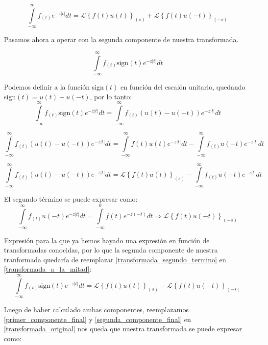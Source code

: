 \documentclass[12pt]{article}
\begin{document}
\begin{equation}
\int\limits_{-\infty}^{\infty} f_{(t)} e^{-z |t|}dt= \mathcal{L}\left\{f(t)u(t)\right\}_{(s)} +  \mathcal{L}\left\{f(t)u(-t)\right\}_{(-s)}
\label{primer_componente_final}
\end{equation}

Pasamos ahora a operar con la segunda componente de nuestra transformada.

$$\int\limits_{-\infty}^{\infty} f_{(t)} \textrm{sign}(t)e^{-z |t|}dt$$

Podemos definir a la función sign$(t)$ en función del escalón unitario, quedando sign$(t) = u(t)-u(-t)$, por lo tanto:
$$\int\limits_{-\infty}^{\infty} f_{(t)} \textrm{sign}(t)e^{-z |t|}dt = \int\limits_{-\infty}^{\infty} f_{(t)} (u(t) -u(-t))e^{-z |t|}dt$$

$$\int\limits_{-\infty}^{\infty} f_{(t)} (u(t) -u(-t))e^{-z |t|}dt =  \int\limits_{-\infty}^{\infty} f(t)u(t) e^{-z |t|}dt - \int\limits_{-\infty}^{\infty} f_{(t)}u(-t) e^{-z |t|}dt$$

\begin{equation}
\int\limits_{-\infty}^{\infty} f_{(t)} (u(t) -u(-t))e^{-z |t|}dt =   \mathcal{L}\left\{f(t)u(t)\right\}_{(s)} - \int\limits_{-\infty}^{\infty} f_{(t)}u(-t) e^{-z |t|}dt
\label{transformada_a_la_mitad}
\end{equation}

El segundo término se puede expresar como:
\begin{equation} \int\limits_{-\infty}^{\infty} f_{(t)}u(-t) e^{-z |t|}dt = \int\limits_{-\infty}^{0} f(t) e^{-z (-t)}dt \Rightarrow  \mathcal{L}\left\{f(t)u(-t)\right\}_{(-s)}
\label{transformada_segundo_termino}
\end{equation}

Expresión para la que ya hemos hayado una expresión en función de transformadas conocidas, por lo que la segunda componente de nuestra tranformada quedaría de reemplazar \ref{transformada_segundo_termino} en \ref{transformada_a_la_mitad}:
 \begin{equation}
 \int\limits_{-\infty}^{\infty} f_{(t)} \textrm{sign}(t)e^{-z |t|}dt =    \mathcal{L}\left\{f(t)u(t)\right\}_{(s)} -  \mathcal{L}\left\{f(t)u(-t)\right\}_{(-s)}
 \label{segunda_componente_final}
 \end{equation}


Luego de haber calculado ambas componentes, reemplazamos \ref{primer_componente_final} y \ref{segunda_componente_final} en \ref{transformada_original} nos queda que nuestra transformada se puede expresar como:
\end{document}
